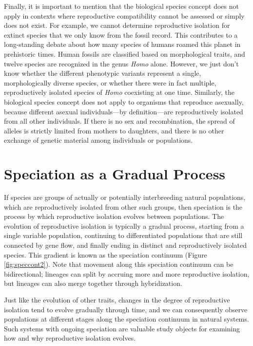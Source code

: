 \documentclass[
]{book}
\begin{document}
Finally, it is important to mention that the biological species concept does not apply in contexts where reproductive compatibility cannot be assessed or simply does not exist. For example, we cannot determine reproductive isolation for extinct species that we only know from the fossil record. This contributes to a long-standing debate about how many species of humans roamed this planet in prehistoric times. Human fossils are classified based on morphological traits, and twelve species are recognized in the genus \emph{Homo} alone. However, we just don't know whether the different phenotypic variants represent a single, morphologically diverse species, or whether there were in fact multiple, reproductively isolated species of \emph{Homo} coexisting at one time. Similarly, the biological species concept does not apply to organisms that reproduce asexually, because different asexual individuals---by definition---are reproductively isolated from all other individuals. If there is no sex and recombination, the spread of alleles is strictly limited from mothers to daughters, and there is no other exchange of genetic material among individuals or populations.

\hypertarget{speciation-as-a-gradual-process}{%
\section{Speciation as a Gradual Process}\label{speciation-as-a-gradual-process}}

If species are groups of actually or potentially interbreeding natural populations, which are reproductively isolated from other such groups, then speciation is the process by which reproductive isolation evolves between populations. The evolution of reproductive isolation is typically a gradual process, starting from a single variable population, continuing to differentiated populations that are still connected by gene flow, and finally ending in distinct and reproductively isolated species. This gradient is known as the speciation continuum (Figure \ref{fig:speccont2}). Note that movement along this speciation continuum can be bidirectional; lineages can split by accruing more and more reproductive isolation, but lineages can also merge together through hybridization.

Just like the evolution of other traits, changes in the degree of reproductive isolation tend to evolve gradually through time, and we can consequently observe populations at different stages along the speciation continuum in natural systems. Such systems with ongoing speciation are valuable study objects for examining how and why reproductive isolation evolves.
\end{document}
